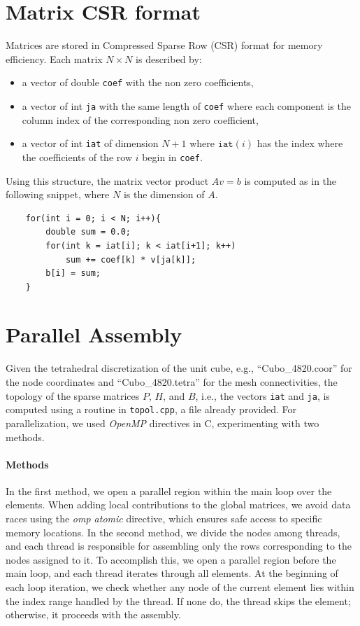 \documentclass[hidelinks]{article}
\begin{document}
\section{Matrix CSR format}
Matrices are stored in Compressed Sparse Row (CSR) format for memory efficiency. Each matrix $N\times N$ is described by:
\begin{itemize}
    \item a vector of double \texttt{coef} with the non zero coefficients,
    \item a vector of int \texttt{ja} with the same length of \texttt{coef} where each component is the column index of the corresponding non zero coefficient,
    \item a vector of int \texttt{iat} of dimension $N+1$ where $\texttt{iat}(i)$ has the index where the coefficients of the row $i$ begin in \texttt{coef}.
\end{itemize}

Using this structure, the matrix vector product $A v = b$ is computed as in the following snippet, where $N$ is the dimension of $A$.

\begin{lstlisting}
    for(int i = 0; i < N; i++){
        double sum = 0.0;
        for(int k = iat[i]; k < iat[i+1]; k++)
            sum += coef[k] * v[ja[k]];
        b[i] = sum;
    }
\end{lstlisting}

\section{Parallel Assembly}

Given the tetrahedral discretization of the unit cube, e.g., ``Cubo\_4820.coor'' for the node coordinates and ``Cubo\_4820.tetra'' for the mesh connectivities, the topology of the sparse matrices $P$, $H$, and $B$, i.e., the vectors \texttt{iat} and \texttt{ja}, is computed using a routine in \texttt{topol.cpp}, a file already provided.
For parallelization, we used \emph{OpenMP} directives in C, experimenting with two methods.

\paragraph{Methods}
In the first method, we open a parallel region within the main loop over the elements. When adding local contributions to the global matrices, we avoid data races using the \emph{omp atomic} directive, which ensures safe access to specific memory locations.
In the second method, we divide the nodes among threads, and each thread is responsible for assembling only the rows corresponding to the nodes assigned to it. To accomplish this, we open a parallel region before the main loop, and each thread iterates through all elements. At the beginning of each loop iteration, we check whether any node of the current element lies within the index range handled by the thread. If none do, the thread skips the element; otherwise, it proceeds with the assembly.
\end{document}
